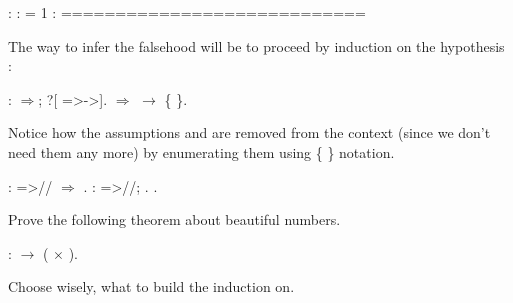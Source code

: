 \coqdoceol
\coqdocemptyline
\coqdocindent{1.00em}
 : \coqdoceol
\coqdocindent{1.00em}
 :  = 1\coqdoceol
\coqdocindent{1.00em}
 :  \coqdoceol
\coqdocindent{1.00em}
============================\coqdoceol
\coqdocindent{1.50em}

\coqdocemptyline


The way to infer the falsehood will be to proceed by induction on the
hypothesis :


\begin{coqdoccode}
\coqdocemptyline
\coqdocnoindent
{}:  \ensuremath{\Rightarrow}; ?[ =>->].\coqdoceol
\coqdocnoindent
{}\ensuremath{\Rightarrow}   \coqdocvar{\_}  \coqdocvar{\_}  \ensuremath{\rightarrow} \{ \}.\coqdoceol
\coqdocemptyline
\end{coqdoccode}


Notice how the assumptions  and  are removed from the context
(since we don't need them any more) by enumerating them using \{ \}
notation.


\begin{coqdoccode}
\coqdocemptyline
\coqdocnoindent
{}:  =>// \ensuremath{\Rightarrow} .\coqdoceol
\coqdocnoindent
{} :  =>//; .\coqdoceol
\coqdocnoindent
{}.\coqdoceol
\coqdocemptyline
\end{coqdoccode}


\begin{exercise}


Prove the following theorem about beautiful numbers.


\begin{coqdoccode}
\coqdocemptyline
\coqdocnoindent
{}   :   \ensuremath{\rightarrow}   ( \ensuremath{\times} ).\coqdoceol
\coqdocemptyline
\end{coqdoccode}


\hint Choose wisely, what to build the induction on.


\end{exercise}


